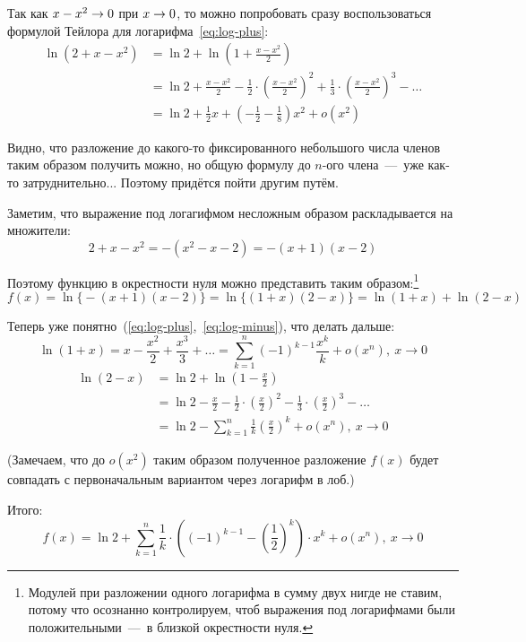 \documentclass[a4paper,12pt]{article}
\begin{document}
  \begin{solution}
    Так как $x \hm- x^2 \hm\to 0$ при $x \hm\to 0$, то можно попробовать сразу воспользоваться формулой Тейлора для логарифма~\eqref{eq:log-plus}:
    \begin{equation*}
    \begin{split}
      \ln{(2 + x - x^2)} &= \ln 2 + \ln\left(1 + \frac{x - x^2}{2}\right)\\
        &= \ln 2 + \frac{x - x^2}{2} - \frac{1}{2} \cdot \left(\frac{x - x^2}{2}\right)^2 + \frac{1}{3} \cdot \left(\frac{x - x^2}{2}\right)^3 - \ldots\\
        &= \ln 2 + \frac{1}{2} x + \left(-\frac{1}{2} - \frac{1}{8}\right) x^2 + o(x^2)
    \end{split}
    \end{equation*}
    
    Видно, что разложение до какого-то фиксированного небольшого числа членов таким образом получить можно, но общую формулу до $n$-ого члена~---~уже как-то затруднительно...
    Поэтому придётся пойти другим путём.
    
    Заметим, что выражение под логагифмом несложным образом раскладывается на множители:
    \[
      2 + x - x^2 = -(x^2 - x - 2) = -(x + 1)(x - 2)
    \]
    
    Поэтому функцию в окрестности нуля можно представить таким образом:\footnote{
      Модулей при разложении одного логарифма в сумму двух нигде не ставим, потому что осознанно контролируем, чтоб выражения под логарифмами были положительными~---~в близкой окрестности нуля.
    }
    \[
      f(x) = \ln{\bigl\{-(x + 1)(x - 2)\bigr\}} = \ln{\bigl\{(1 + x)(2 - x)\bigr\}} = \ln{(1 + x)} + \ln{(2 - x)}
    \]
    
    Теперь уже понятно~(\ref{eq:log-plus},~\ref{eq:log-minus}), что делать дальше:
    \[
      \ln{(1 + x)} = x - \frac{x^2}{2} + \frac{x^3}{3} + \ldots = \sum_{k = 1}^n (-1)^{k - 1} \frac{x^k}{k} + o(x^n),\ x \to 0
    \]
    \begin{equation*}
    \begin{split}
      \ln{(2 - x)} &= \ln 2 + \ln\left(1 - \frac{x}{2}\right)\\
      &= \ln 2 - \frac{x}{2} - \frac{1}{2} \cdot \left(\frac{x}{2}\right)^2 - \frac{1}{3} \cdot \left(\frac{x}{2}\right)^3 - \ldots\\
      &= \ln 2 - \sum_{k = 1}^n \frac{1}{k} \left(\frac{x}{2}\right)^k + o(x^n),\ x \to 0
    \end{split}
    \end{equation*}
    
    (Замечаем, что до $o(x^2)$ таким образом полученное разложение $f(x)$ будет совпадать с первоначальным вариантом через логарифм в лоб.)
    
    Итого:
    \[
      f(x) = \ln 2 + \sum_{k = 1}^n \frac{1}{k} \cdot \left((-1)^{k - 1} - \left(\frac{1}{2}\right)^k\right) \cdot x^k + o(x^n),\ x \to 0
    \]
  \end{solution}
  
\end{document}
